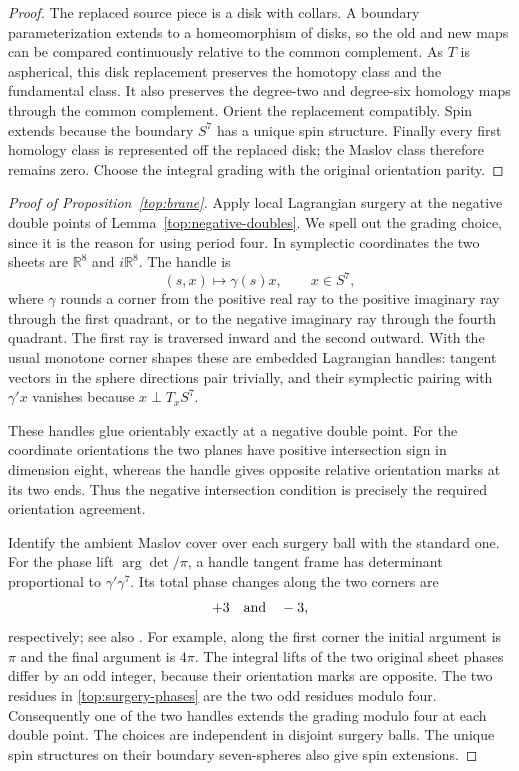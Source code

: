 \documentclass[11pt]{article}
\theoremstyle{definition}
\theoremstyle{remark}
\numberwithin{equation}{section}
\begin{document}
\begin{proof}
The replaced source piece is a disk with collars.  A boundary
parameterization extends to a homeomorphism of disks, so the
old and new maps can be compared continuously relative to
the common complement.  As $T$ is aspherical, this disk
replacement preserves the homotopy class and the fundamental
class.  It also preserves the degree-two and degree-six
homology maps through the common complement.  Orient the
replacement compatibly.  Spin extends because the boundary
$S^7$ has a unique spin structure.  Finally every first
homology class is represented off the replaced disk; the
Maslov class therefore remains zero.  Choose the integral
grading with the original orientation parity.
\end{proof}

\begin{proof}[Proof of Proposition~\ref{top:brane}]
Apply local Lagrangian surgery at the negative double points
of Lemma~\ref{top:negative-doubles}.  We spell out the
grading choice, since it is the reason for using period four.
In symplectic coordinates the two sheets are
$\mathbb R^8$ and $i\mathbb R^8$.  The handle is
\[
 (s,x)\longmapsto\gamma(s)x,\qquad x\in S^7,
\]
where $\gamma$ rounds a corner from the positive real ray
to the positive imaginary ray through the first quadrant,
or to the negative imaginary ray through the fourth
quadrant.  The first ray is traversed inward and the second
outward.  With the usual monotone corner shapes these are
embedded Lagrangian handles: tangent vectors in the sphere
directions pair trivially, and their symplectic pairing
with $\gamma' x$ vanishes because $x\perp T_xS^7$.

These handles glue orientably exactly at a negative double
point.  For the coordinate orientations the two planes have
positive intersection sign in dimension eight, whereas
the handle gives opposite relative orientation marks at
its two ends.  Thus the negative intersection condition is
precisely the required orientation agreement.

Identify the ambient Maslov cover over each surgery ball
with the standard one.  For the phase lift $\arg\det/\pi$, a handle tangent frame
has determinant proportional to $\gamma'\gamma^7$.
Its total phase changes along the two corners are
\begin{equation}\label{top:surgery-phases}
 +3\quad\hbox{and}\quad-3,
\end{equation}
respectively; see also \cite[Lemma~2.4]{ekholm-smith}.
For example, along the first corner the initial argument
is $\pi$ and the final argument is $4\pi$.
The integral lifts of the two original sheet phases differ
by an odd integer, because their orientation marks are
opposite.  The two residues in \eqref{top:surgery-phases}
are the two odd residues modulo four.  Consequently one
of the two handles extends the grading modulo four at
each double point.  The choices are independent in
disjoint surgery balls.  The unique spin structures on
their boundary seven-spheres also give spin extensions.


\end{proof}
\end{document}
